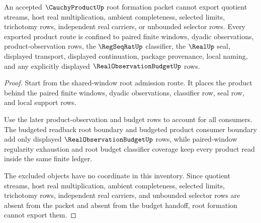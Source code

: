 \begin{theorem}
\label{thm:cauchyproduct-root-budget-nonescape}
An accepted $\CauchyProductUp$ root formation packet cannot export quotient streams, host real multiplication, ambient completeness, selected limits, trichotomy rows, independent real carriers, or unbounded selector rows. Every exported product route is confined to paired finite windows, dyadic observations, product-observation rows, the $\RegSeqRatUp$ classifier, the $\RealUp$ seal, displayed transport, displayed continuation, package provenance, local naming, and any explicitly displayed $\RealObservationBudgetUp$ rows.
\end{theorem}
\begin{proof}
Start from the shared-window root admission route. It places the product behind the paired finite windows, dyadic observations, classifier row, seal row, and local support rows.

Use the later product-observation and budget rows to account for all consumers. The budgeted readback root boundary and budgeted product consumer boundary add only displayed $\RealObservationBudgetUp$ rows, while paired-window regularity exhaustion and root budget classifier coverage keep every product read inside the same finite ledger.

The excluded objects have no coordinate in this inventory. Since quotient streams, host real multiplication, ambient completeness, selected limits, trichotomy rows, independent real carriers, and unbounded selector rows are absent from the packet and absent from the budget handoff, root formation cannot export them.
\end{proof}

